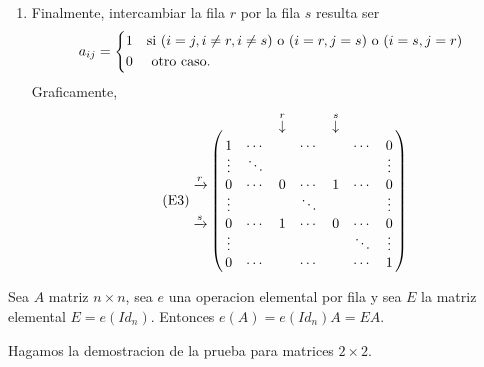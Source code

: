 \documentclass{article}
\theoremstyle{definition}
\theoremstyle{definition}
\theoremstyle{remark}
\let\bbordermatrix\bordermatrix
\begin{document}
\begin{enumerate}[label=\textcolor{azulp2}{E\arabic*.}]
  \item Finalmente, intercambiar la fila $r$ por la fila $s$ resulta ser \[
      a_{ij}=\begin{dcases} 1 & \text{si } (i=j,i\neq r,i\neq s)\text{ o } (i=r,j=s) \text{ o } (i=s,j=r) \\
      0 & \text{ otro caso. } \end{dcases}
    \]
    Graficamente, \begin{equation}\tag{E3} 
      \bbordermatrix{
        ~& && \overset{r}{\downarrow} & & \overset{s}{\downarrow} \cr 
         & 1 & \cdots & & \cdots & & \cdots & 0 \cr
         & \vdots & \ddots & & & && \vdots \cr 
        \xrightarrow{r} & 0 & \cdots & 0 & \cdots & 1 & \cdots & 0 \cr 
                        & \vdots & & & \ddots & & & \vdots \cr
                      \xrightarrow{s}  & 0 & \cdots & 1 & \cdots & 0 & \cdots & 0 \cr
        & \vdots & & & && \ddots  & \vdots\cr
                        & 0 & \cdots &  & \cdots &  & \cdots &   1 \cr
                    }\end{equation}
 \end{enumerate}\begin{teo}
   Sea $A$ matriz $n \times n$, sea $e$ una operacion elemental por fila y sea $E$ la matriz elemental $E=e(Id_n)$. Entonces $e(A)=e(Id_n)A=EA$.
 \end{teo}
Hagamos la demostracion de la prueba para matrices $2 \times 2$.
\end{document}
